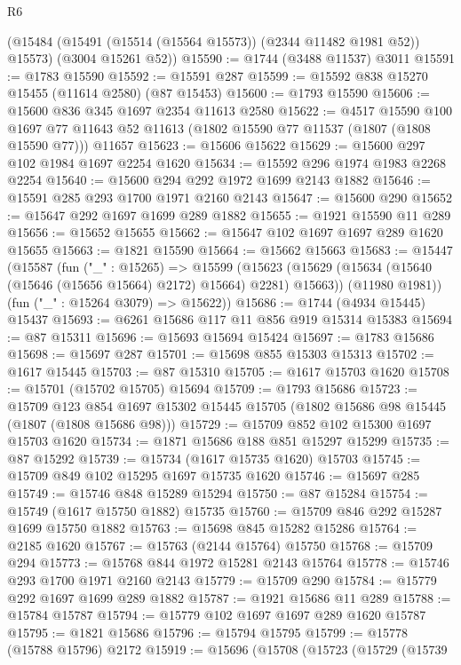 \begin{lexlean}{R6}
\begin{coremodule}
      (@15484 (@15491 (@15514 (@15564 @15573)) (@2344 @11482 @1981 @52)) @15573)
      (@3004 @15261 @52))
@15590 := @1744 (@3488 @11537) @3011
@15591 := @1783 @15590
@15592 := @15591 @287
@15599 := @15592 @838 @15270 @15455 (@11614 @2580) (@87 @15453)
@15600 := @1793 @15590
@15606 := @15600 @836 @345 @1697 @2354 @11613 @2580
@15622 := @4517
    @15590
    @100
    @1697
    @77
    @11643
    @52
    @11613
    (@1802 @15590 @77 @11537 (@1807 (@1808 @15590 @77)))
    @11657
@15623 := @15606 @15622
@15629 := @15600 @297 @102 @1984 @1697 @2254 @1620
@15634 := @15592 @296 @1974 @1983 @2268 @2254
@15640 := @15600 @294 @292 @1972 @1699 @2143 @1882
@15646 := @15591 @285 @293 @1700 @1971 @2160 @2143
@15647 := @15600 @290
@15652 := @15647 @292 @1697 @1699 @289 @1882
@15655 := @1921 @15590 @11 @289
@15656 := @15652 @15655
@15662 := @15647 @102 @1697 @1697 @289 @1620 @15655
@15663 := @1821 @15590
@15664 := @15662 @15663
@15683 := @15447
    (@15587
      (fun ("_" : @15265) =>
      @15599
        (@15623 (@15629 (@15634 (@15640 (@15646 (@15656 @15664) @2172) @15664) @2281) @15663))
        (@11980 @1981))
      (fun ("_" : @15264 @3079) => @15622))
@15686 := @1744 (@4934 @15445) @15437
@15693 := @6261 @15686 @117 @11 @856 @919 @15314 @15383
@15694 := @87 @15311
@15696 := @15693 @15694 @15424
@15697 := @1783 @15686
@15698 := @15697 @287
@15701 := @15698 @855 @15303 @15313
@15702 := @1617 @15445
@15703 := @87 @15310
@15705 := @1617 @15703 @1620
@15708 := @15701 (@15702 @15705) @15694
@15709 := @1793 @15686
@15723 := @15709
    @123
    @854
    @1697
    @15302
    @15445
    @15705
    (@1802 @15686 @98 @15445 (@1807 (@1808 @15686 @98)))
@15729 := @15709 @852 @102 @15300 @1697 @15703 @1620
@15734 := @1871 @15686 @188 @851 @15297 @15299
@15735 := @87 @15292
@15739 := @15734 (@1617 @15735 @1620) @15703
@15745 := @15709 @849 @102 @15295 @1697 @15735 @1620
@15746 := @15697 @285
@15749 := @15746 @848 @15289 @15294
@15750 := @87 @15284
@15754 := @15749 (@1617 @15750 @1882) @15735
@15760 := @15709 @846 @292 @15287 @1699 @15750 @1882
@15763 := @15698 @845 @15282 @15286
@15764 := @2185 @1620
@15767 := @15763 (@2144 @15764) @15750
@15768 := @15709 @294
@15773 := @15768 @844 @1972 @15281 @2143 @15764
@15778 := @15746 @293 @1700 @1971 @2160 @2143
@15779 := @15709 @290
@15784 := @15779 @292 @1697 @1699 @289 @1882
@15787 := @1921 @15686 @11 @289
@15788 := @15784 @15787
@15794 := @15779 @102 @1697 @1697 @289 @1620 @15787
@15795 := @1821 @15686
@15796 := @15794 @15795
@15799 := @15778 (@15788 @15796) @2172
@15919 := @15696
    (@15708
      (@15723
        (@15729
          (@15739

\end{coremodule}
\end{lexlean}
